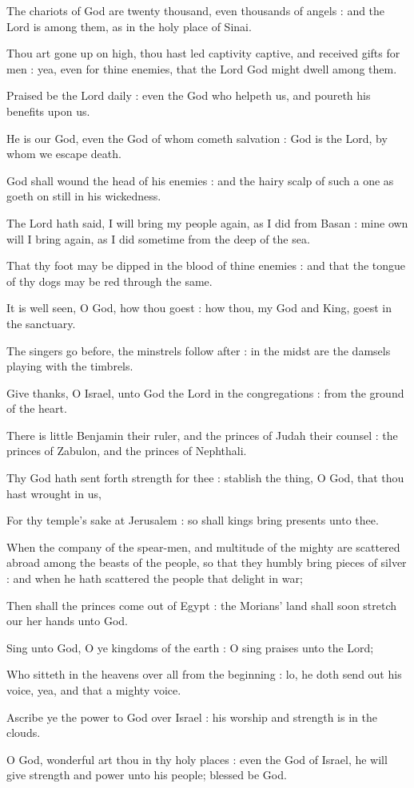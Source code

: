 The chariots of God are twenty thousand, even thousands of angels : and the Lord is among them, as in the holy place of Sinai.\par
{}Thou art gone up on high, thou hast led captivity captive, and received gifts for men : yea, even for thine enemies, that the Lord God might dwell among them.\par
{}Praised be the Lord daily : even the God who helpeth us, and poureth his benefits upon us.\par
{}He is our God, even the God of whom cometh salvation : God is the Lord, by whom we escape death.\par
{}God shall wound the head of his enemies : and the hairy scalp of such a one as goeth on still in his wickedness.\par
{}The Lord hath said, I will bring my people again, as I did from Basan : mine own will I bring again, as I did sometime from the deep of the sea.\par
{}That thy foot may be dipped in the blood of thine enemies : and that the tongue of thy dogs may be red through the same.\par
{}It is well seen, O God, how thou goest : how thou, my God and King, goest in the sanctuary.\par
{}The singers go before, the minstrels follow after : in the midst are the damsels playing with the timbrels.\par
{}Give thanks, O Israel, unto God the Lord in the congregations : from the ground of the heart.\par
{}There is little Benjamin their ruler, and the princes of Judah their counsel : the princes of Zabulon, and the princes of Nephthali.\par
{}Thy God hath sent forth strength for thee : stablish the thing, O God, that thou hast wrought in us,\par
{}For thy temple's sake at Jerusalem : so shall kings bring presents unto thee.\par
{}When the company of the spear-men, and multitude of the mighty are scattered abroad among the beasts of the people, so that they humbly bring pieces of silver : and when he hath scattered the people that delight in war;\par
{}Then shall the princes come out of Egypt : the Morians' land shall soon stretch our her hands unto God.\par
{}Sing unto God, O ye kingdoms of the earth : O sing praises unto the Lord;\par
{}Who sitteth in the heavens over all from the beginning : lo, he doth send out his voice, yea, and that a mighty voice.\par
{}Ascribe ye the power to God over Israel : his worship and strength is in the clouds.\par
{}O God, wonderful art thou in thy holy places : even the God of Israel, he will give strength and power unto his people; blessed be God.\par

